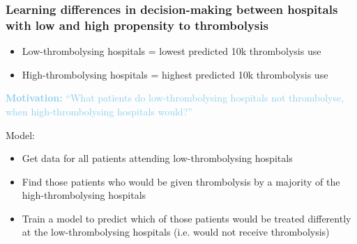 \documentclass[xcolor={usenames,dvipsnames}]{beamer}
\begin{document}

\begin{frame}
\frametitle{Learning differences in decision-making between hospitals with low and high propensity to thrombolysis}

\vspace{-0.5em}

\begin{itemize}
  \footnotesize
  \item Low-thrombolysing hospitals = lowest predicted 10k thrombolysis use
  \item High-thrombolysing hospitals = highest predicted 10k thrombolysis use
\end{itemize} 

\vspace{1.5em}

\textcolor{SkyBlue}{\textbf{Motivation:} ``What patients do low-thrombolysing hospitals not thrombolyse, when high-thrombolysing hospitals would?''} 

\vspace{1.5em}

Model:
\begin{itemize}
  \footnotesize
  \item Get data for all patients attending low-thrombolysing hospitals
  \item Find those patients who would be given thrombolysis by a majority of the high-thrombolysing hospitals
  \item Train a model to predict which of those patients would be treated differently at the low-thrombolysing hospitals (i.e. would not receive thrombolysis)
\end{itemize}

\end{frame}


\end{document}
